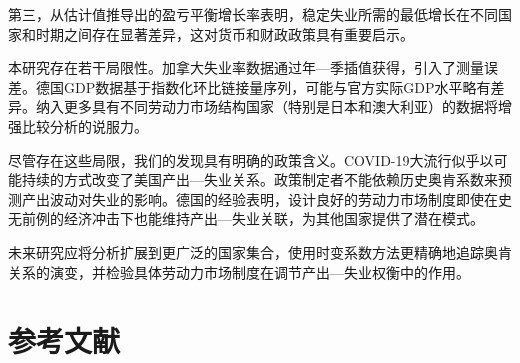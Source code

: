 \documentclass[12pt,a4paper,UTF8]{ctexart}
\begin{document}
第三，从估计值推导出的盈亏平衡增长率表明，稳定失业所需的最低增长在不同国家和时期之间存在显著差异，这对货币和财政政策具有重要启示。

本研究存在若干局限性。加拿大失业率数据通过年—季插值获得，引入了测量误差。德国GDP数据基于指数化环比链接量序列，可能与官方实际GDP水平略有差异。纳入更多具有不同劳动力市场结构国家（特别是日本和澳大利亚）的数据将增强比较分析的说服力。

尽管存在这些局限，我们的发现具有明确的政策含义。COVID-19大流行似乎以可能持续的方式改变了美国产出—失业关系。政策制定者不能依赖历史奥肯系数来预测产出波动对失业的影响。德国的经验表明，设计良好的劳动力市场制度即使在史无前例的经济冲击下也能维持产出—失业关联，为其他国家提供了潜在模式。

未来研究应将分析扩展到更广泛的国家集合，使用时变系数方法更精确地追踪奥肯关系的演变，并检验具体劳动力市场制度在调节产出—失业权衡中的作用。

\newpage

\section*{参考文献}
\end{document}
